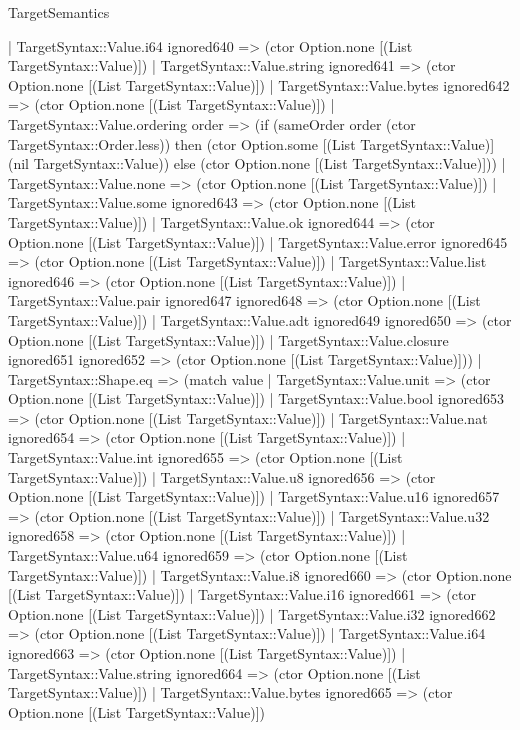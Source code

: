 \begin{lexlean}{TargetSemantics}
\begin{semanticmodule}
{      | TargetSyntax::Value.i64 ignored640 => (ctor Option.none [(List TargetSyntax::Value)])
      | TargetSyntax::Value.string ignored641 => (ctor Option.none [(List TargetSyntax::Value)])
      | TargetSyntax::Value.bytes ignored642 => (ctor Option.none [(List TargetSyntax::Value)])
      | TargetSyntax::Value.ordering order => (if (sameOrder order (ctor TargetSyntax::Order.less)) then (ctor Option.some [(List TargetSyntax::Value)] (nil TargetSyntax::Value)) else (ctor Option.none [(List TargetSyntax::Value)]))
      | TargetSyntax::Value.none => (ctor Option.none [(List TargetSyntax::Value)])
      | TargetSyntax::Value.some ignored643 => (ctor Option.none [(List TargetSyntax::Value)])
      | TargetSyntax::Value.ok ignored644 => (ctor Option.none [(List TargetSyntax::Value)])
      | TargetSyntax::Value.error ignored645 => (ctor Option.none [(List TargetSyntax::Value)])
      | TargetSyntax::Value.list ignored646 => (ctor Option.none [(List TargetSyntax::Value)])
      | TargetSyntax::Value.pair ignored647 ignored648 => (ctor Option.none [(List TargetSyntax::Value)])
      | TargetSyntax::Value.adt ignored649 ignored650 => (ctor Option.none [(List TargetSyntax::Value)])
      | TargetSyntax::Value.closure ignored651 ignored652 => (ctor Option.none [(List TargetSyntax::Value)]))
    | TargetSyntax::Shape.eq => (match value
      | TargetSyntax::Value.unit => (ctor Option.none [(List TargetSyntax::Value)])
      | TargetSyntax::Value.bool ignored653 => (ctor Option.none [(List TargetSyntax::Value)])
      | TargetSyntax::Value.nat ignored654 => (ctor Option.none [(List TargetSyntax::Value)])
      | TargetSyntax::Value.int ignored655 => (ctor Option.none [(List TargetSyntax::Value)])
      | TargetSyntax::Value.u8 ignored656 => (ctor Option.none [(List TargetSyntax::Value)])
      | TargetSyntax::Value.u16 ignored657 => (ctor Option.none [(List TargetSyntax::Value)])
      | TargetSyntax::Value.u32 ignored658 => (ctor Option.none [(List TargetSyntax::Value)])
      | TargetSyntax::Value.u64 ignored659 => (ctor Option.none [(List TargetSyntax::Value)])
      | TargetSyntax::Value.i8 ignored660 => (ctor Option.none [(List TargetSyntax::Value)])
      | TargetSyntax::Value.i16 ignored661 => (ctor Option.none [(List TargetSyntax::Value)])
      | TargetSyntax::Value.i32 ignored662 => (ctor Option.none [(List TargetSyntax::Value)])
      | TargetSyntax::Value.i64 ignored663 => (ctor Option.none [(List TargetSyntax::Value)])
      | TargetSyntax::Value.string ignored664 => (ctor Option.none [(List TargetSyntax::Value)])
      | TargetSyntax::Value.bytes ignored665 => (ctor Option.none [(List TargetSyntax::Value)])
}
\end{semanticmodule}
\end{lexlean}

